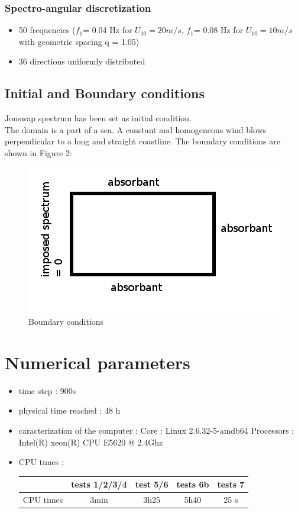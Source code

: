 \documentclass[10pt]{article}
\begin{document}
\subsubsection{Spectro-angular discretization}
\begin{itemize}
\item 50 frequencies ($f_1 $= 0.04 Hz for $U_{10} = 20m/s$, $f_1 $= 0.08 Hz for $U_{10} = 10m/s$ with geometric spacing q = 1.05)
\item 36 directions uniformly distributed
\end{itemize}

\subsection{Initial and Boundary conditions}
Jonswap spectrum has been set as initial condition.\\
The domain is a part of a sea. A constant and homogeneous wind blows perpendicular to a long and straight coastline. The boundary conditions are shown in Figure 2:
\begin{figure}
\centering
\includegraphics[scale=0.5]{boundarycond.jpg}
\caption{Boundary conditions}
\end{figure}
\section{Numerical parameters}
\begin{itemize}
\item time step : 900s
\item physical time reached : 48 h
\item caracterization of the computer : \subitem Core : Linux 2.6.32-5-amdb64 \subitem Processors : Intel(R)
xeon(R) CPU E5620 @ 2.4Ghz
\item CPU times : \\
\begin{tabular}{c|c|c|c|c}
 & tests 1/2/3/4 & test 5/6 &tests 6b & tests 7\\
 \hline
CPU times & 3min & 3h25 & 5h40 & 25 s \\
\end{tabular}
\end{itemize}
\end{document}
